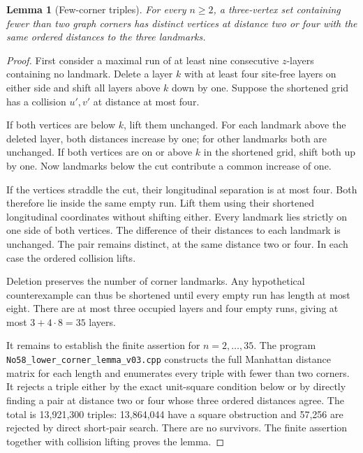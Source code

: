 \documentclass[11pt,a4paper]{article}
\newcommand{\code}[1]{{\small\nolinkurl{#1}}}
\newtheorem{lemma}{Lemma}
\begin{document}
\begin{lemma}[Few-corner triples]\label{lem:compression}
For every $n\ge2$, a three-vertex set containing fewer than two graph corners has distinct vertices at distance two or four with the same ordered distances to the three landmarks.
\end{lemma}
\begin{proof}
First consider a maximal run of at least nine consecutive $z$-layers containing no landmark. Delete a layer $k$ with at least four site-free layers on either side and shift all layers above $k$ down by one. Suppose the shortened grid has a collision $u',v'$ at distance at most four.

If both vertices are below $k$, lift them unchanged. For each landmark above the deleted layer, both distances increase by one; for other landmarks both are unchanged. If both vertices are on or above $k$ in the shortened grid, shift both up by one. Now landmarks below the cut contribute a common increase of one.

If the vertices straddle the cut, their longitudinal separation is at most four. Both therefore lie inside the same empty run. Lift them using their shortened longitudinal coordinates without shifting either. Every landmark lies strictly on one side of both vertices. The difference of their distances to each landmark is unchanged. The pair remains distinct, at the same distance two or four. In each case the ordered collision lifts.

Deletion preserves the number of corner landmarks. Any hypothetical counterexample can thus be shortened until every empty run has length at most eight. There are at most three occupied layers and four empty runs, giving at most $3+4\cdot8=35$ layers.

It remains to establish the finite assertion for $n=2,\ldots,35$. The program \code{No58_lower_corner_lemma_v03.cpp} constructs the full Manhattan distance matrix for each length and enumerates every triple with fewer than two corners. It rejects a triple either by the exact unit-square condition below or by directly finding a pair at distance two or four whose three ordered distances agree. The total is 13,921,300 triples: 13,864,044 have a square obstruction and 57,256 are rejected by direct short-pair search. There are no survivors. The finite assertion together with collision lifting proves the lemma.
\end{proof}
\end{document}
